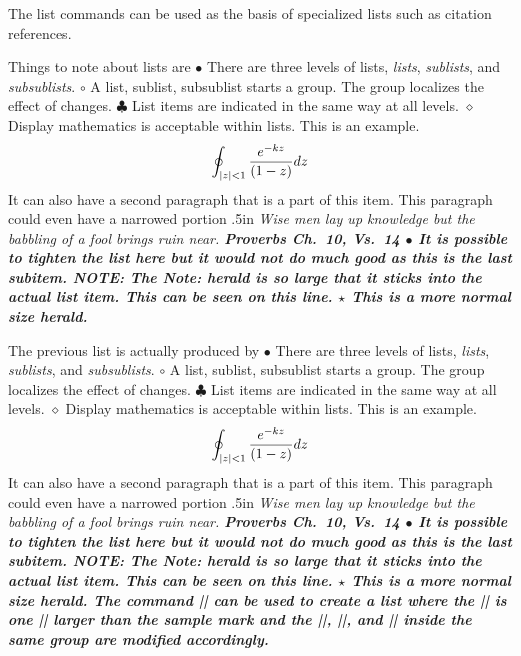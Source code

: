The list commands can be used as the basis of specialized lists such as
citation references. 

Things to note about lists are
\beginlist
\li $\bullet$ There are three levels of lists, {\it lists},
      {\it sublists}, and {\it subsublists}.
\beginsublist
\eightpoint
\li $\circ$ A list, sublist, subsublist starts a group. 
        The group localizes the effect of changes.
\li $\clubsuit$ List items are indicated in the same way at 
        all levels. 
\li $\diamond$ Display mathematics is acceptable within lists.
        This is an example.
    $$ 
     \oint_{\vert z\vert < 1} {e^{-kz} \over (1-z)} dz
    $$
It can also have a second paragraph that is a part of this
item. This paragraph could even have a narrowed portion
\beginnarrowtext .5in
\tenpoint \it \noindent
Wise men lay up knowledge but the babbling
of a fool brings ruin near. 
\bf Proverbs Ch.~10, Vs.~14
\endnarrowtext
\li $\bullet$ It is possible to tighten the list here 
    but it would not do much good as this is the last 
    subitem.
\endsublist
\li NOTE: The {\it Note:} herald is so large that it sticks {\bf into}
          the actual list item. This can be seen on this line.
\li $\star$ This is a more normal size herald.
\endlist
\ejectpage

The previous list is actually produced by
\begintt
\beginlist
\li $\bullet$ There are three levels of lists, {\it lists},
      {\it sublists}, and {\it subsublists}.
\beginsublist
\eightpoint
\li $\circ$ A list, sublist, subsublist starts a group. 
        The group localizes the effect of changes.
\li $\clubsuit$ List items are indicated in the same way at 
        all levels. 
\li $\diamond$ Display mathematics is acceptable within lists.
        This is an example.
    $$ 
     \oint_{\vert z\vert < 1} {e^{-kz} \over (1-z)} dz
    $$
It can also have a second paragraph that is a part of this
item. This paragraph could even have a narrowed portion
\beginnarrowtext .5in
\tenpoint \it \noindent
Wise men lay up knowledge but the babbling
of a fool brings ruin near. 
\bf Proverbs Ch.~10, Vs.~14
\endnarrowtext
\li $\bullet$ It is possible to tighten the list here 
    but it would not do much good as this is the last 
    subitem.
\endsublist
\li NOTE: The {\it Note:} herald is so large that it sticks 
          {\bf into} the actual list item. This can be seen 
          on this line.
\li $\star$ This is a more normal size herald.
\endlist
\endtt
The command || can be used to
create a list where the |\listitemmarksize| is one |\enspace| larger than the
sample mark and the |\listindent|, |\sublistindent|, and 
|\subsublistindent|
{\bf inside} the same group are modified accordingly. 


